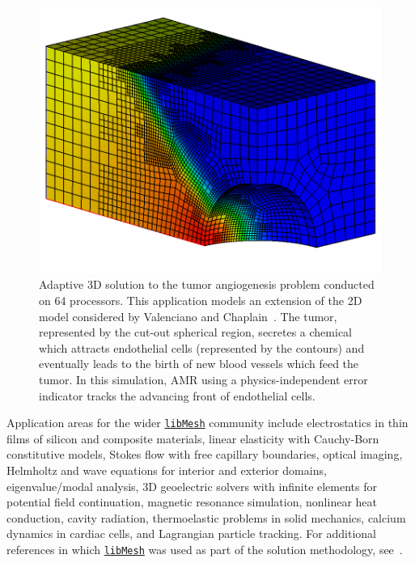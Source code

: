 \documentclass[global,twocolumn,final]{svjour}
\newcommand{\libMesh}{\href{http://libmesh.sourceforge.net}{\texttt{lib\-Mesh}}}
\begin{document}
\begin{figure}[hbt]
  \begin{center}
    \includegraphics[width=\columnwidth]{figures/tumor_model}    
    \caption{Adaptive 3D solution to the tumor angiogenesis problem
      conducted on 64 processors.  
      This application models an extension of the 2D model considered
      by Valenciano and Chaplain~\cite{VaCh04}.  The tumor,
      represented by the cut-out spherical region, secretes a chemical
      which attracts endothelial cells (represented by the contours)
      and eventually leads to the birth of new blood vessels which feed
      the tumor.  In this simulation, AMR using a physics-independent
      error indicator tracks the advancing front of endothelial cells.
      \label{fig:tumor_model}}
  \end{center}
\end{figure}

Application areas for the wider \libMesh{} community include
electrostatics in thin films of silicon and composite materials,
linear elasticity with Cauchy-Born constitutive models, Stokes flow
with free capillary boundaries, optical imaging, Helmholtz and wave
equations for interior and exterior domains, eigenvalue/modal
analysis, 3D geoelectric solvers with infinite elements for potential
field continuation, magnetic resonance simulation, nonlinear heat
conduction, cavity radiation, thermoelastic problems in solid
mechanics, calcium dynamics in cardiac cells, and Lagrangian particle
tracking.  For additional references in which \libMesh{} was used as
part of the solution methodology,
see~\cite{modelling_error,Tumor,Simedrea_CSCBC,Schindler_2005,carey_bail_2004,PeteS06,DreyD06,BrinM06,lu_2005_biophysical_poster}.
\end{document}
